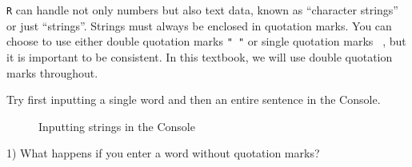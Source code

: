 \documentclass[
  letterpaper,
  DIV=11,
  numbers=noendperiod,
  oneside]{scrreprt}
\begin{document}
\texttt{R} can handle not only numbers but also text data, known as
``character strings'' or just ``strings''. Strings must always be
enclosed in quotation marks. You can choose to use either double
quotation marks \texttt{"\ "} or single quotation marks
\texttt{\textquotesingle{}\ \textquotesingle{}}, but it is important to
be consistent. In this textbook, we will use double quotation marks
throughout.

Try first inputting a single word and then an entire sentence in the
Console.

\begin{figure}


\caption{\label{fig-ConsoleInputStrings}Inputting strings in the
Console}

\end{figure}%

\begin{tcolorbox}[enhanced jigsaw, breakable, colbacktitle=quarto-callout-tip-color!10!white, bottomtitle=1mm, colframe=quarto-callout-tip-color-frame, leftrule=.75mm, bottomrule=.15mm, colback=white, toptitle=1mm, rightrule=.15mm, title=\textcolor{quarto-callout-tip-color}{\faLightbulb}\hspace{0.5em}{Quiz time!}, coltitle=black, opacityback=0, arc=.35mm, left=2mm, titlerule=0mm, toprule=.15mm, opacitybacktitle=0.6]

1) What happens if you enter a word without quotation marks?

\end{tcolorbox}
\end{document}
